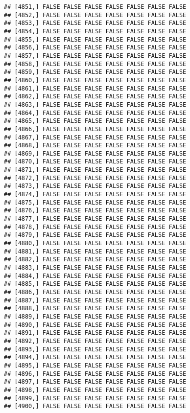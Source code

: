 \documentclass[
]{article}
\begin{document}
\begin{verbatim}
## [4851,] FALSE FALSE FALSE FALSE FALSE FALSE FALSE
## [4852,] FALSE FALSE FALSE FALSE FALSE FALSE FALSE
## [4853,] FALSE FALSE FALSE FALSE FALSE FALSE FALSE
## [4854,] FALSE FALSE FALSE FALSE FALSE FALSE FALSE
## [4855,] FALSE FALSE FALSE FALSE FALSE FALSE FALSE
## [4856,] FALSE FALSE FALSE FALSE FALSE FALSE FALSE
## [4857,] FALSE FALSE FALSE FALSE FALSE FALSE FALSE
## [4858,] FALSE FALSE FALSE FALSE FALSE FALSE FALSE
## [4859,] FALSE FALSE FALSE FALSE FALSE FALSE FALSE
## [4860,] FALSE FALSE FALSE FALSE FALSE FALSE FALSE
## [4861,] FALSE FALSE FALSE FALSE FALSE FALSE FALSE
## [4862,] FALSE FALSE FALSE FALSE FALSE FALSE FALSE
## [4863,] FALSE FALSE FALSE FALSE FALSE FALSE FALSE
## [4864,] FALSE FALSE FALSE FALSE FALSE FALSE FALSE
## [4865,] FALSE FALSE FALSE FALSE FALSE FALSE FALSE
## [4866,] FALSE FALSE FALSE FALSE FALSE FALSE FALSE
## [4867,] FALSE FALSE FALSE FALSE FALSE FALSE FALSE
## [4868,] FALSE FALSE FALSE FALSE FALSE FALSE FALSE
## [4869,] FALSE FALSE FALSE FALSE FALSE FALSE FALSE
## [4870,] FALSE FALSE FALSE FALSE FALSE FALSE FALSE
## [4871,] FALSE FALSE FALSE FALSE FALSE FALSE FALSE
## [4872,] FALSE FALSE FALSE FALSE FALSE FALSE FALSE
## [4873,] FALSE FALSE FALSE FALSE FALSE FALSE FALSE
## [4874,] FALSE FALSE FALSE FALSE FALSE FALSE FALSE
## [4875,] FALSE FALSE FALSE FALSE FALSE FALSE FALSE
## [4876,] FALSE FALSE FALSE FALSE FALSE FALSE FALSE
## [4877,] FALSE FALSE FALSE FALSE FALSE FALSE FALSE
## [4878,] FALSE FALSE FALSE FALSE FALSE FALSE FALSE
## [4879,] FALSE FALSE FALSE FALSE FALSE FALSE FALSE
## [4880,] FALSE FALSE FALSE FALSE FALSE FALSE FALSE
## [4881,] FALSE FALSE FALSE FALSE FALSE FALSE FALSE
## [4882,] FALSE FALSE FALSE FALSE FALSE FALSE FALSE
## [4883,] FALSE FALSE FALSE FALSE FALSE FALSE FALSE
## [4884,] FALSE FALSE FALSE FALSE FALSE FALSE FALSE
## [4885,] FALSE FALSE FALSE FALSE FALSE FALSE FALSE
## [4886,] FALSE FALSE FALSE FALSE FALSE FALSE FALSE
## [4887,] FALSE FALSE FALSE FALSE FALSE FALSE FALSE
## [4888,] FALSE FALSE FALSE FALSE FALSE FALSE FALSE
## [4889,] FALSE FALSE FALSE FALSE FALSE FALSE FALSE
## [4890,] FALSE FALSE FALSE FALSE FALSE FALSE FALSE
## [4891,] FALSE FALSE FALSE FALSE FALSE FALSE FALSE
## [4892,] FALSE FALSE FALSE FALSE FALSE FALSE FALSE
## [4893,] FALSE FALSE FALSE FALSE FALSE FALSE FALSE
## [4894,] FALSE FALSE FALSE FALSE FALSE FALSE FALSE
## [4895,] FALSE FALSE FALSE FALSE FALSE FALSE FALSE
## [4896,] FALSE FALSE FALSE FALSE FALSE FALSE FALSE
## [4897,] FALSE FALSE FALSE FALSE FALSE FALSE FALSE
## [4898,] FALSE FALSE FALSE FALSE FALSE FALSE FALSE
## [4899,] FALSE FALSE FALSE FALSE FALSE FALSE FALSE
## [4900,] FALSE FALSE FALSE FALSE FALSE FALSE FALSE

\end{verbatim}
\end{document}
